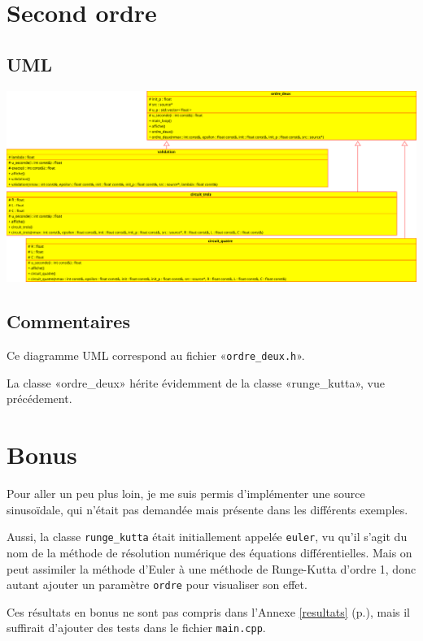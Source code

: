\documentclass{report}
\begin{document}
\chapter{Second ordre}
    \begin{multicols}{2}
        \section{UML}
            \includegraphics[width=\linewidth+\linewidth,angle=90]{images/ordre_deux}

        \section{Commentaires}
            Ce diagramme UML correspond au fichier «\verb|ordre_deux.h|».

            La classe «ordre\_deux» hérite évidemment de la classe «runge\_kutta», vue précédement.
    \end{multicols}

\chapter{Bonus}
Pour aller un peu plus loin, je me suis permis d’implémenter une source sinusoïdale, qui n’était pas demandée
mais présente dans les différents exemples.

Aussi, la classe \verb|runge_kutta| était initiallement appelée \verb|euler|, vu qu’il s’agit du nom de la
méthode de résolution numérique des équations différentielles. Mais on peut assimiler la méthode d’Euler à
une méthode de Runge-Kutta d’ordre 1, donc autant ajouter un paramètre \verb|ordre| pour visualiser son effet.

Ces résultats en bonus ne sont pas compris dans l’Annexe \ref{resultats} (p.\pageref{resultats}), mais il 
suffirait d’ajouter des tests dans le fichier \verb|main.cpp|.
\end{document}

